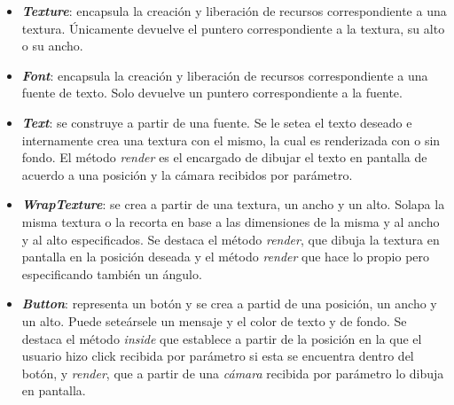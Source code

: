\begin{itemize}
	\item \textbf{\textit{Texture}}: encapsula la creación y liberación de recursos correspondiente a una textura. Únicamente devuelve el puntero correspondiente a la textura, su alto o su ancho.

	\item \textbf{\textit{Font}}: encapsula la creación y liberación de recursos correspondiente a una fuente de texto. Solo devuelve un puntero correspondiente a la fuente.

	\item \textbf{\textit{Text}}: se construye a partir de una fuente. Se le setea el texto deseado e internamente crea una textura con el mismo, la cual es renderizada con o sin fondo. El método \textit{render} es el encargado de dibujar el texto en pantalla de acuerdo a una posición y la cámara recibidos por parámetro.

	\item \textbf{\textit{WrapTexture}}: se crea a partir de una textura, un ancho y un alto. Solapa la misma textura o la recorta en base a las dimensiones de la misma y al ancho y al alto especificados. Se destaca el método \textit{render}, que dibuja la textura en pantalla en la posición deseada y el método \textit{render} que hace lo propio pero especificando también un ángulo.

	\item \textbf{\textit{Button}}: representa un botón y se crea a partid de una posición, un ancho y un alto. Puede seteársele un mensaje y el color de texto y de fondo. Se destaca el método \textit{inside} que establece a partir de la posición en la que el usuario hizo click recibida por parámetro si esta se encuentra dentro del botón, y \textit{render}, que a partir de una \textit{cámara} recibida por parámetro lo dibuja en pantalla.


\end{itemize}
